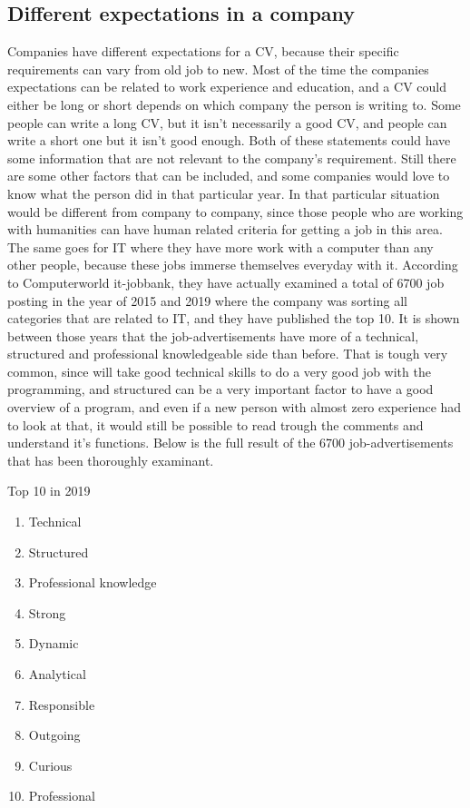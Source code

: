 \subsection{Different expectations in a company}
Companies have different expectations for a CV, because their specific requirements can vary from old job to new.
Most of the time the companies expectations can be related to work experience and education,
and a CV could either be long or short depends on which company the person is writing to. Some people can write a long CV,
but it isn't necessarily a good CV, and people can write a short one but it isn't good enough.
Both of these statements could have some information that are not relevant to the company's requirement. Still there are some other
factors that can be included, and some companies would love to know what the person did in that particular year.
In that particular situation would be different from company to company, since those people who are working with humanities
can have human related criteria for getting a job in this area. The same goes for IT where they have more work with a computer
than any other people, because these jobs immerse themselves everyday with it. According to Computerworld it-jobbank,
they have actually examined a total of 6700 job posting in the year of 2015 and 2019 where the company was sorting all categories
that are related to IT, and they have published the top 10. It is shown between those years that the job-advertisements
have more of a technical, structured and professional knowledgeable side than before.\cite{10_personal_skills}
That is tough very common, since will take good technical skills to do a very good job with the programming,
and structured can be a very important factor to have a good overview of a program,
and even if a new person with almost zero experience had to look at that,
it would still be possible to read trough the comments and understand it's functions. Below is the full result
of the 6700 job-advertisements that has been thoroughly examinant.

Top 10 in 2019
\begin{enumerate}

\item Technical
\item Structured
\item Professional knowledge
\item Strong
\item Dynamic
\item Analytical
\item Responsible
\item Outgoing
\item Curious
\item Professional
\end{enumerate}


